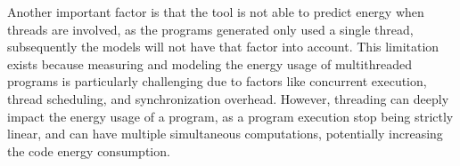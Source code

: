 Another important factor is that the tool is not able to predict energy when threads are involved, as the programs generated only used a single thread, subsequently the models will not have that factor into account. This limitation exists because measuring and modeling the energy usage of multithreaded programs is particularly challenging due to factors like concurrent execution, thread scheduling, and synchronization overhead. However, threading can deeply impact the energy usage of a program, as a program execution stop being strictly linear, and can have multiple simultaneous computations, potentially increasing the code energy consumption.





%
%
%
%
%
